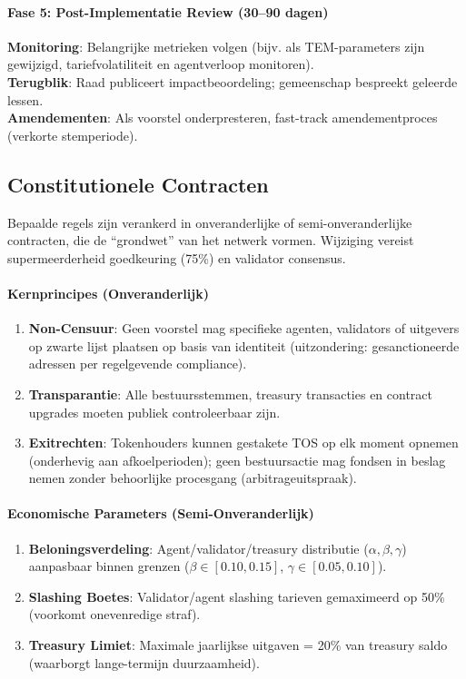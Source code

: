 \documentclass[11pt]{article}
\begin{document}
\paragraph{Fase 5: Post-Implementatie Review (30--90 dagen)}
\textbf{Monitoring}: Belangrijke metrieken volgen (bijv. als TEM-parameters zijn gewijzigd, tariefvolatiliteit en agentverloop monitoren).\\
\textbf{Terugblik}: Raad publiceert impactbeoordeling; gemeenschap bespreekt geleerde lessen.\\
\textbf{Amendementen}: Als voorstel onderpresteren, fast-track amendementproces (verkorte stemperiode).

\subsection{Constitutionele Contracten}

Bepaalde regels zijn verankerd in onveranderlijke of semi-onveranderlijke contracten, die de ``grondwet'' van het netwerk vormen. Wijziging vereist supermeerderheid goedkeuring (75\%) en validator consensus.

\paragraph{Kernprincipes (Onveranderlijk)}
\begin{enumerate}[noitemsep]
  \item \textbf{Non-Censuur}: Geen voorstel mag specifieke agenten, validators of uitgevers op zwarte lijst plaatsen op basis van identiteit (uitzondering: gesanctioneerde adressen per regelgevende compliance).
  \item \textbf{Transparantie}: Alle bestuursstemmen, treasury transacties en contract upgrades moeten publiek controleerbaar zijn.
  \item \textbf{Exitrechten}: Tokenhouders kunnen gestakete TOS op elk moment opnemen (onderhevig aan afkoelperioden); geen bestuursactie mag fondsen in beslag nemen zonder behoorlijke procesgang (arbitrageuitspraak).
\end{enumerate}

\paragraph{Economische Parameters (Semi-Onveranderlijk)}
\begin{enumerate}[noitemsep]
  \item \textbf{Beloningsverdeling}: Agent/validator/treasury distributie ($\alpha, \beta, \gamma$) aanpasbaar binnen grenzen ($\beta \in [0.10, 0.15]$, $\gamma \in [0.05, 0.10]$).
  \item \textbf{Slashing Boetes}: Validator/agent slashing tarieven gemaximeerd op 50\% (voorkomt onevenredige straf).
  \item \textbf{Treasury Limiet}: Maximale jaarlijkse uitgaven = 20\% van treasury saldo (waarborgt lange-termijn duurzaamheid).
\end{enumerate}
\end{document}
